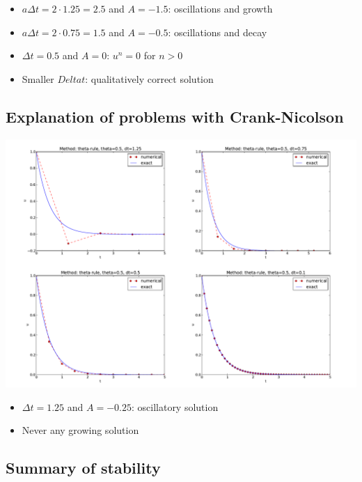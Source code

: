 \documentclass[%
oneside,                 %
final,                   %
10pt]{article}
\begin{document}
\begin{itemize}
 \item $a\Delta t= 2\cdot 1.25=2.5$ and $A=-1.5$: oscillations and growth

 \item $a\Delta t = 2\cdot 0.75=1.5$ and $A=-0.5$: oscillations and decay

 \item $\Delta t=0.5$ and $A=0$: $u^n=0$ for $n>0$

 \item Smaller $Delta t$: qualitatively correct solution
\end{itemize}

\noindent
\subsection*{Explanation of problems with Crank-Nicolson}



\centerline{\includegraphics[width=1.1\linewidth]{fig-analysis/CN4c.pdf}}



\begin{itemize}
 \item $\Delta t=1.25$ and $A=-0.25$: oscillatory solution

 \item Never any growing solution
\end{itemize}

\noindent
\subsection*{Summary of stability}
\end{document}
